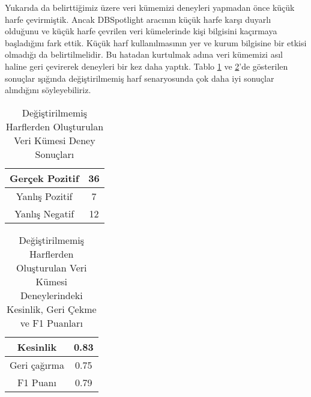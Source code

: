 \documentclass[conference]{IEEEtran}
\begin{document}

Yukar{\i}da da belirtti\u{g}imiz üzere veri kümemizi deneyleri yapmadan önce kü\c{c}ük harfe \c{c}evirmi\c{s}tik.
Ancak DBSpotlight arac{\i}n{\i}n kü\c{c}ük harfe kar\c{s}{\i} duyarl{\i} oldu\u{g}unu ve kü\c{c}ük harfe \c{c}evrilen veri kümelerinde ki\c{s}i bilgisini ka\c{c}{\i}rmaya ba\c{s}lad{\i}\u{g}{\i}n{\i} fark ettik. Kü\c{c}ük harf kullan{\i}lmas{\i}n{\i}n yer ve kurum bilgisine bir etkisi olmad{\i}\u{g}{\i} da belirtilmelidir. Bu hatadan kurtulmak ad{\i}na veri kümemizi as{\i}l haline geri \c{c}evirerek deneyleri bir kez daha yapt{\i}k. Tablo \ref{test_result_sc} ve \ref{prf1_sc}'de gösterilen sonu\c{c}lar {\i}\c{s}{\i}\u{g}{\i}nda de\u{g}i\c{s}tirilmemi\c{s} harf senaryosunda \c{c}ok daha iyi sonu\c{c}lar al{\i}nd{\i}\u{g}{\i}n{\i} söyleyebiliriz.
\begin{table}[!t]
	\caption{De\u{g}i\c{s}tirilmemi\c{s} Harflerden Olu\c{s}turulan Veri K\"{u}mesi Deney Sonu\c{c}lar{\i}}
	\label{test_result_sc}
	\centering
	\begin{tabular}{|c|c|}
		\hline
		Gerçek Pozitif & 36 \\
		\hline
		Yanl{\i}\c{s} Pozitif & 7 \\
		\hline
		Yanl{\i}\c{s} Negatif & 12 \\
		\hline
	\end{tabular}
\end{table}
\begin{table}[!t]
	\caption{De\u{g}i\c{s}tirilmemi\c{s} Harflerden Olu\c{s}turulan Veri K\"{u}mesi Deneylerindeki Kesinlik, Geri \c{C}ekme ve F1 Puanlar{\i}}
	\label{prf1_sc}
	\centering
	\begin{tabular}{|c|c|}
		\hline
		Kesinlik & 0.83 \\
		\hline
		Geri \c{c}a\u{g}{\i}rma & 0.75 \\
		\hline
		F1 Puan{\i} & 0.79 \\
		\hline
	\end{tabular}
\end{table}

\end{document}
